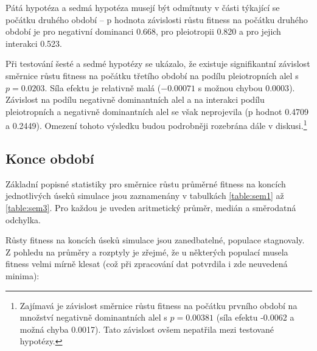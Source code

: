 Pátá hypotéza a sedmá hypotéza musejí být odmítnuty v části  týkající se počátku druhého období --
p hodnota závislosti růstu fitness na počátku druhého období je pro negativní dominanci 0.668,
pro pleiotropii 0.820 a pro jejich interakci 0.523.

Při testování šesté a sedmé hypotézy se ukázalo, že existuje signifikantní závislost směrnice růstu fitness na počátku
třetího období na podílu pleiotropních alel s $p = 0.0203$. Síla efektu je relativně malá ($-0.00071$ s možnou
chybou $0.0003$). Závislost na podílu negativně dominantních alel a na interakci podílu pleiotropních a negativně
dominantních alel se však neprojevila (p hodnot 0.4709 a 0.2449). Omezení tohoto výsledku budou podrobněji rozebrána
dále v diskusi.\footnote{
Zajímavá je závislost směrnice růstu fitness na počátku prvního období na množství negativně dominantních alel s
$p=0.00381$ (síla efektu -0.0062 a možná chyba 0.0017).
Tato závislost ovšem nepatřila mezi testované hypotézy.
}


\subsection{Konce období}

Základní popisné statistiky pro směrnice růstu průměrné fitness na koncích jednotlivých úseků simulace
jsou zaznamenány v tabulkách \ref{table:sem1} až \ref{table:sem3}. Pro každou je uveden aritmetický průměr, medián a
směrodatná odchylka.

Růsty fitness na koncích úseků simulace jsou zanedbatelné, populace stagnovaly.
Z pohledu na průměry a rozptyly je zřejmé, že u některých populací musela fitness velmi mírně klesat (což při
zpracování dat potvrdila i zde neuvedená minima):

